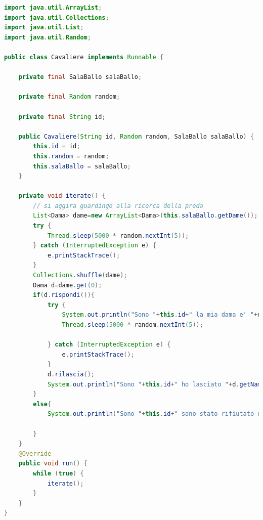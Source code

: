 \documentclass{article}
\begin{document}
\begin{lstlisting}[language=Java]
import java.util.ArrayList;
import java.util.Collections;
import java.util.List;
import java.util.Random;

public class Cavaliere implements Runnable {

	private final SalaBallo salaBallo;

	private final Random random;

	private final String id;

	public Cavaliere(String id, Random random, SalaBallo salaBallo) {
		this.id = id;
		this.random = random;
		this.salaBallo = salaBallo;
	}

	private void iterate() {
		// si aggira guardingo alla ricerca della preda
		List<Dama> dame=new ArrayList<Dama>(this.salaBallo.getDame());
		try {
			Thread.sleep(5000 * random.nextInt(5));
		} catch (InterruptedException e) {
			e.printStackTrace();
		}
		Collections.shuffle(dame);
		Dama d=dame.get(0);
		if(d.rispondi()){
			try {
				System.out.println("Sono "+this.id+" la mia dama e' "+d.getName());
				Thread.sleep(5000 * random.nextInt(5));
				
			} catch (InterruptedException e) {
				e.printStackTrace();
			}
			d.rilascia();
			System.out.println("Sono "+this.id+" ho lasciato "+d.getName());
		}
		else{
			System.out.println("Sono "+this.id+" sono stato rifiutato da "+d.getName());
			
		}
	}
	@Override
	public void run() {
		while (true) {
			iterate();
		}
	}
}
\end{lstlisting}
\end{document}
